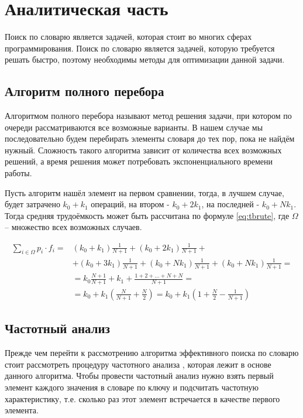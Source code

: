 \chapter{Аналитическая часть}

Поиск по словарю является задачей, которая стоит во многих сферах программирования. Поиск по словарю является задачей, которую требуется решать быстро, поэтому необходимы методы для оптимизации данной задачи.


\section{Алгоритм полного перебора}

Алгоритмом полного перебора \cite{brute} называют метод решения задачи, при котором по очереди рассматриваются все возможные варианты. В нашем случае мы последовательно будем перебирать элементы словаря до тех пор, пока не найдём нужный. Сложность такого алгоритма зависит от количества всех возможных решений, а время решения может потребовать экспоненциального времени работы. 

Пусть алгоритм нашёл элемент на первом сравнении, тогда, в лучшем случае, будет затрачено $k_0+k_1$ операций, на втором - $k_0+2k_1$, на последней - $k_0+Nk_1$. Тогда средняя трудоёмкость может быть рассчитана по формуле \ref{eq:tbrute}, где $\Omega$ -- множество всех возможных случаев.

\begin{equation} \label{eq:tbrute}
\begin {aligned}
\sum\limits_{i\in\Omega} p_i\cdot f_i = & (k_0 + k_1)\frac{1}{N+1}+(k_0+2k_1)\frac{1}{N+1} +\\
&+ (k_0+3k_1)\frac{1}{N+1}+(k_0+Nk_1)\frac{1}{N+1}+(k_0+Nk_1)\frac{1}{N+1} =\\
&= k_0\frac{N+1}{N+1}+k_1+\frac{1+2+...+N+N}{N+1} = \\
&=k_0+k_1(\frac{N}{N+1}+\frac{N}{2}) = k_0+k_1(1+\frac{N}{2}-\frac{1}{N+1})
\end{aligned}
\end{equation}
\section{Частотный анализ}

Прежде чем перейти к рассмотрению алгоритма эффективного поиска по словарю стоит рассмотреть процедуру частотного анализа \cite{fa}, которая лежит в основе данного алгоритма. Чтобы провести частотный анализ нужно взять первый элемент каждого значения в словаре по ключу и подсчитать частотную характеристику, т.е. сколько раз этот элемент встречается в качестве первого элемента. 

